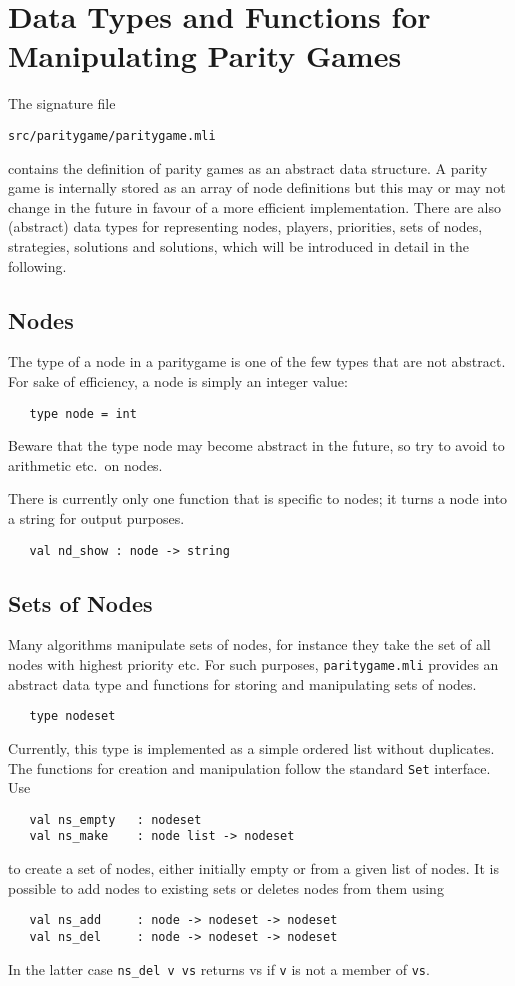 \section{Data Types and Functions for Manipulating Parity Games}

The signature file
\begin{verbatim}
src/paritygame/paritygame.mli
\end{verbatim}
contains the definition of parity games as an abstract data structure.
A parity game is internally stored as an array of node definitions but this may or may not change in the future
in favour of a more efficient implementation. There are also (abstract) data types for representing nodes, players,
priorities, sets of nodes, strategies, solutions and solutions, which will be introduced in detail in the following.

\subsection{Nodes}

The type of a node in a paritygame is one of the few types that are not abstract. For sake of efficiency, a node is 
simply an integer value:
\begin{verbatim}
   type node = int
\end{verbatim}
Beware that the type node may become abstract in the future, so try to avoid to arithmetic etc.\ on nodes. 

There is currently only one function that is specific to nodes; it turns a node into a string for output purposes.
\begin{verbatim}
   val nd_show : node -> string
\end{verbatim}


\subsection{Sets of Nodes}

Many algorithms manipulate sets of nodes, for instance they take the set of all nodes with highest priority etc. For 
such purposes, \verb#paritygame.mli# provides an abstract data type and functions for storing and manipulating sets of nodes.
\begin{verbatim}
   type nodeset
\end{verbatim}
Currently, this type is implemented as a simple ordered list without duplicates. The functions for creation and manipulation
follow the standard \verb#Set# interface. Use
\begin{verbatim}
   val ns_empty   : nodeset
   val ns_make    : node list -> nodeset
\end{verbatim}
to create a set of nodes, either initially empty or from a given list of nodes. It is possible to add nodes to existing sets
or deletes nodes from them using
\begin{verbatim}
   val ns_add     : node -> nodeset -> nodeset
   val ns_del     : node -> nodeset -> nodeset
\end{verbatim}
In the latter case \verb#ns_del v vs# returns vs if \verb#v# is not a member of \verb#vs#.

